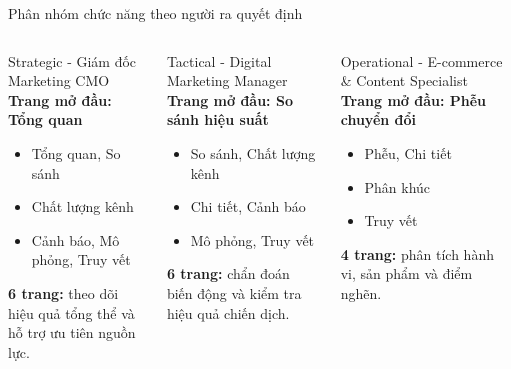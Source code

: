 \documentclass[aspectratio=169]{beamer}
\begin{document}
\begin{frame}{Phân nhóm chức năng theo người ra quyết định}
  \small
  \begin{columns}[T,onlytextwidth]
    \begin{block}{Strategic - Giám đốc Marketing CMO}
      \scriptsize
      \textbf{Trang mở đầu: Tổng quan}
      \begin{itemize}
        \item Tổng quan, So sánh
        \item Chất lượng kênh
        \item Cảnh báo, Mô phỏng, Truy vết
      \end{itemize}
      \textbf{6 trang:} theo dõi hiệu quả tổng thể và hỗ trợ ưu tiên nguồn lực.
    \end{block}
    \begin{block}{Tactical - Digital Marketing Manager}
      \scriptsize
      \textbf{Trang mở đầu: So sánh hiệu suất}
      \begin{itemize}
        \item So sánh, Chất lượng kênh
        \item Chi tiết, Cảnh báo
        \item Mô phỏng, Truy vết
      \end{itemize}
      \textbf{6 trang:} chẩn đoán biến động và kiểm tra hiệu quả chiến dịch.
    \end{block}
    \begin{block}{Operational - E-commerce \& Content Specialist}
      \scriptsize
      \textbf{Trang mở đầu: Phễu chuyển đổi}
      \begin{itemize}
        \item Phễu, Chi tiết
        \item Phân khúc
        \item Truy vết
      \end{itemize}
      \textbf{4 trang:} phân tích hành vi, sản phẩm và điểm nghẽn.
    \end{block}
  \end{columns}
\end{frame}
\end{document}
